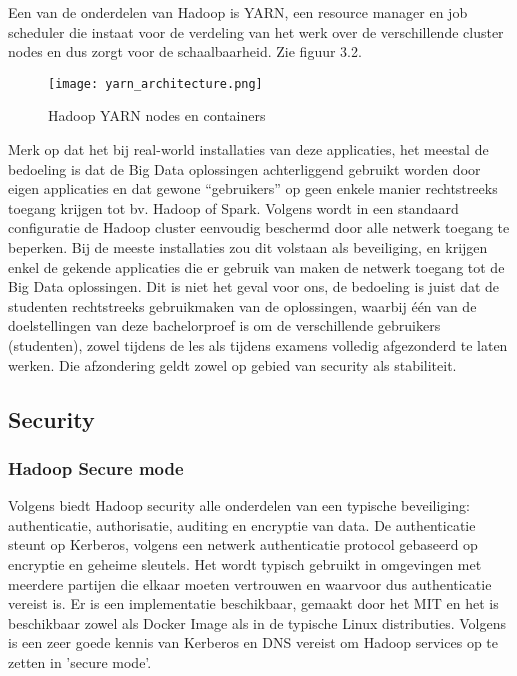 Een van de onderdelen van Hadoop is YARN, een resource manager en job scheduler die instaat voor de verdeling van het werk over de verschillende cluster nodes en dus zorgt voor de schaalbaarheid. Zie figuur 3.2.
\newline
\begin{figure}[H]
    \texttt{[image: yarn\_architecture.png]}
    \caption{Hadoop YARN nodes en containers\autocite{Hadoop2023d}}
\end{figure}

Merk op dat het bij real-world installaties van deze applicaties, het meestal de bedoeling is dat de Big Data oplossingen achterliggend gebruikt worden door eigen applicaties en dat gewone ``gebruikers'' op geen enkele manier rechtstreeks toegang krijgen tot bv. Hadoop of Spark.
\newline
Volgens \autocite{Hadoop2023} wordt in een standaard configuratie de Hadoop cluster eenvoudig beschermd door alle netwerk toegang te beperken. 
Bij de meeste installaties zou dit volstaan als beveiliging, en krijgen enkel de gekende applicaties die er gebruik van maken de netwerk toegang tot de Big Data oplossingen.
\newline
\newline
Dit is niet het geval voor ons, de bedoeling is juist dat de studenten rechtstreeks gebruikmaken van de oplossingen, waarbij één van de doelstellingen van deze bachelorproef is om de verschillende gebruikers (studenten), zowel tijdens de les als tijdens examens volledig afgezonderd te laten werken. Die afzondering geldt zowel op gebied van security als stabiliteit.

\subsection{Security}

\subsubsection{Hadoop Secure mode}
Volgens \textcite{Kiran2022} biedt Hadoop security alle onderdelen van een typische beveiliging: authenticatie, authorisatie, auditing en encryptie van data.
De authenticatie steunt op Kerberos, volgens \textcite{Kerberos2023} een netwerk authenticatie protocol gebaseerd op encryptie en geheime sleutels. Het wordt typisch gebruikt in omgevingen met meerdere partijen die elkaar moeten vertrouwen en waarvoor dus authenticatie vereist is. Er is een implementatie beschikbaar, gemaakt door het MIT en het is beschikbaar zowel als Docker Image als in de typische Linux distributies.
\newline
Volgens \textcite{Hadoop2023} is een zeer goede kennis van Kerberos en DNS vereist om Hadoop services op te zetten in 'secure mode'.
\newline
\newline

